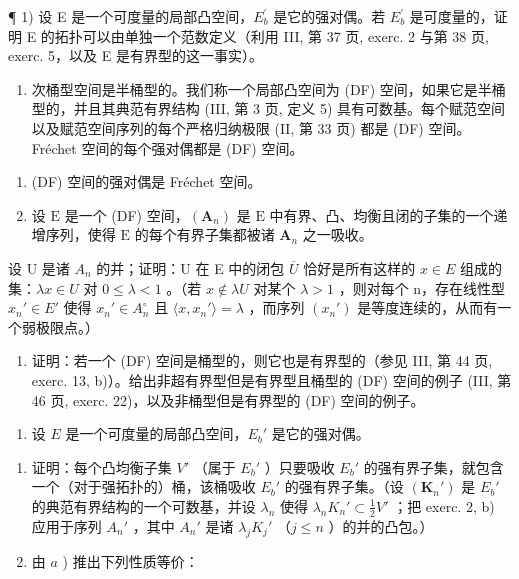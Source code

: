 \exercisegroup

¶ 1) 设 E 是一个可度量的局部凸空间，\(E_{b}^{\prime}\) 是它的强对偶。若 \(E_{b}^{\prime}\) 是可度量的，证明 E 的拓扑可以由单独一个范数定义（利用 III, 第 37 页, exerc. 2 与第 38 页, exerc. 5，以及 E 是有界型的这一事实）。

\begin{enumerate}
\def\labelenumi{\arabic{enumi})}
\setcounter{enumi}{1}
\tightlist
\item
  次桶型空间是半桶型的。我们称一个局部凸空间为 (DF) 空间，如果它是半桶型的，并且其典范有界结构 (III, 第 3 页, 定义 5) 具有可数基。每个赋范空间以及赋范空间序列的每个严格归纳极限 (II, 第 33 页) 都是 (DF) 空间。Fréchet 空间的每个强对偶都是 (DF) 空间。
\end{enumerate}

\begin{enumerate}
\def\labelenumi{\alph{enumi})}
\item
  (DF) 空间的强对偶是 Fréchet 空间。
\item
  设 \(\mathrm{E}\) 是一个 (DF) 空间，\((\mathbf{A}_n)\) 是 \(\mathrm{E}\) 中有界、凸、均衡且闭的子集的一个递增序列，使得 \(\mathrm{E}\) 的每个有界子集都被诸 \(\mathbf{A}_n\) 之一吸收。
\end{enumerate}

  设 U 是诸 \(A_{n}\) 的并；证明：U 在 E 中的闭包 \(\overline{U}\) 恰好是所有这样的 \(x \in E\) 组成的集：\(\lambda x \in U\) 对 \(0 \leqslant \lambda < 1\) 。（若 \(x \notin \lambda U\) 对某个 \(\lambda > 1\) ，则对每个 n，存在线性型 \(x_{n}' \in E'\) 使得 \(x_{n}' \in A_{n}^{\circ}\) 且 \(\langle x, x_{n}' \rangle = \lambda\) ，而序列 \((x_{n}')\) 是等度连续的，从而有一个弱极限点。）

\begin{enumerate}
\def\labelenumi{\alph{enumi})}
\setcounter{enumi}{2}
\tightlist
\item
  证明：若一个 (DF) 空间是桶型的，则它也是有界型的（参见 III, 第 44 页, exerc. 13, b)）。给出非超有界型但是有界型且桶型的 (DF) 空间的例子 (III, 第 46 页, exerc. 22)，以及非桶型但是有界型的 (DF) 空间的例子。
\end{enumerate}

\begin{enumerate}
\def\labelenumi{\arabic{enumi})}
\setcounter{enumi}{2}
\tightlist
\item
  设 \(E\) 是一个可度量的局部凸空间，\(E_b'\) 是它的强对偶。
\end{enumerate}

\begin{enumerate}
\def\labelenumi{\alph{enumi})}
\item
  证明：每个凸均衡子集 \(V'\) （属于 \(E_{b}'\) ）只要吸收 \(E_{b}'\) 的强有界子集，就包含一个（对于强拓扑的）桶，该桶吸收 \(E_{b}'\) 的强有界子集。（设 \((\mathbf{K}_{n}')\) 是 \(E_{b}'\) 的典范有界结构的一个可数基，并设 \(\lambda_{n}\) 使得 \(\lambda_{n}K_{n}' \subset \frac{1}{2}V'\) ；把 exerc. 2, b) 应用于序列 \(A_{n}'\) ，其中 \(A_{n}'\) 是诸 \(\lambda_{j}K_{j}'\) （\(j \leqslant n\) ）的并的凸包。）
\item
  由 \(a\) ) 推出下列性质等价：
\end{enumerate}

